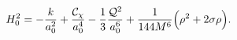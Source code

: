 \begin{equation}
 \label{1eq17}
 H_0^2 = -\frac{k}{a_0^2} +\frac{{\cal C}_{\chi}}{a_0^4} -\frac{1}{3}
\frac{{\cal Q}^2}{a_0^6}  + \frac{1}{144M^6} \Big( \rho^2 +
2\sigma \rho \Big).
 \end{equation}


